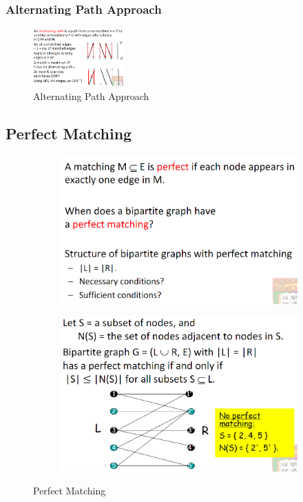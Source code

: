 \subsubsection{Alternating Path Approach}
\begin{figure}[H]
    \centering
    \includegraphics[width=0.309\textwidth]{pic/DAA10/Alternating Path Approach}
    \caption{Alternating Path Approach}
\end{figure}


\subsection{Perfect Matching}
\begin{figure}[H]
    \centering
    \begin{subfigure}{0.309\textwidth}
        \centering
        \includegraphics[width=\textwidth]{pic/DAA10/Perfect Matching1}
    \end{subfigure}
    \begin{subfigure}{0.309\textwidth}
        \centering
        \includegraphics[width=\textwidth]{pic/DAA10/Perfect Matching2}
    \end{subfigure}
    \caption{Perfect Matching}
\end{figure}

